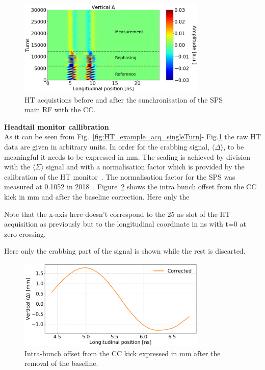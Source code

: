 \begin{figure}[!h]
   \centering         
   \includegraphics[width=0.8\textwidth]{images/Ch4/HT_measures_vs_reference_vs_corrected__20180530_135105_baseline_correction_onlyDelta.png}
       \caption{HT acquistions before and after the sunchronisation of the SPS main RF with the CC.}
       \label{fig:HT_baseline_correction_measurements_2D}
\end{figure}


\normalsize{\textbf{Headtail monitor callibration}}\\
As it can be seen from Fig.~\ref{fig:HT_example_acq_singleTurn}- Fig.\ref{fig:HT_baseline_correction_measurements_2D} the raw HT data are given in arbitrary units. In order for the crabbing signal, $\langle \Delta \rangle$, to be meaningful it needs to be expressed in mm. The scaling is achieved by division with the $\langle \Sigma \rangle$ signal and with a normalisation factor which is provided by the calibration of the HT monitor~\cite{PhysRevAccelBeams.22.112803}. The normalisation factor for the SPS was measured at 0.1052 in 2018~\cite{HT_calibration_2018}. Figure~\ref{fig:HT_baseline_correction_crabbing_mm} shows the intra bunch offset from the CC kick in mm and after the baseline correction. Here only the 


Note that the x-axis here doesn’t correspond to the 25 ns slot of the HT acquisition as previously but to the longitudinal coordinate in ns with t=0 at zero crossing. 


Here only the crabbing part  of the signal is shown while the rest is discarted.


\begin{figure}[!h]
   \centering         
   \includegraphics[width=0.8\textwidth]{images/Ch4/HT_measures_vs_reference_vs_corrected__20180530_135105_baseline_correction_mm.png}
       \caption{Intra-bunch offset from the CC kick expressed in mm after the removal of the baseline.}
       \label{fig:HT_baseline_correction_crabbing_mm}
\end{figure}



